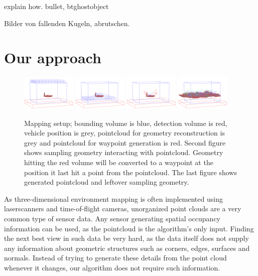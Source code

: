 \documentclass[a4paper, 10pt, conference]{ieeeconf}        %
\begin{document}
explain how. bullet, btghostobject

Bilder von fallenden Kugeln, abrutschen.

\section{Our approach}

\begin{figure}[ht]
  \centering
    \includegraphics[width=0.23\textwidth]{images/expl1}
    \includegraphics[width=0.23\textwidth]{images/expl2}
    \includegraphics[width=0.23\textwidth]{images/expl3}
    \includegraphics[width=0.23\textwidth]{images/process5}
    \caption{Mapping setup; bounding volume is blue, detection volume is red, vehicle position is grey, pointcloud for geometry reconstruction is grey and pointcloud for waypoint generation is red. Second figure shows sampling geometry interacting with pointcloud. Geometry hitting the red volume will be converted to a waypoint at the position it last hit a point from the pointcloud. The last figure shows generated pointcloud and leftover sampling geometry.}
\end{figure}

As three-dimensional environment mapping is often implemented using laserscanners and time-of-flight cameras, unorganized point clouds are a very common type of sensor data. Any sensor generating spatial occupancy information can be used, as the pointcloud is the algorithm's only input. Finding the next best view in such data be very hard, as the data itself does not supply any information about geometric structures such as corners, edges, surfaces and normals. Instead of trying to generate these details from the point cloud whenever it changes, our algorithm does not require such information.
\end{document}
